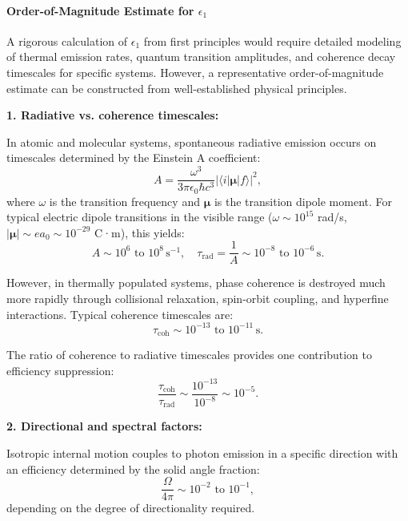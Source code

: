 \documentclass[12pt,letterpaper]{article}
\begin{document}
\paragraph{Order-of-Magnitude Estimate for $\epsilon_1$}

A rigorous calculation of $\epsilon_1$ from first principles would require detailed modeling of thermal emission rates, quantum transition amplitudes, and coherence decay timescales for specific systems. However, a representative order-of-magnitude estimate can be constructed from well-established physical principles.

\textbf{1. Radiative vs. coherence timescales:}

In atomic and molecular systems, spontaneous radiative emission occurs on timescales determined by the Einstein A coefficient:
\begin{equation}
A = \frac{\omega^3}{3\pi\epsilon_0\hbar c^3} |\langle i|\bm{\mu}|f\rangle|^2,
\end{equation}
where $\omega$ is the transition frequency and $\bm{\mu}$ is the transition dipole moment. For typical electric dipole transitions in the visible range ($\omega \sim 10^{15}$ rad/s, $|\bm{\mu}| \sim ea_0 \sim 10^{-29}$ C·m), this yields:
\begin{equation}
A \sim 10^6 \text{ to } 10^8 \, \text{s}^{-1}, \quad \tau_{\text{rad}} = \frac{1}{A} \sim 10^{-8} \text{ to } 10^{-6} \, \text{s}.
\end{equation}

However, in thermally populated systems, phase coherence is destroyed much more rapidly through collisional relaxation, spin-orbit coupling, and hyperfine interactions. Typical coherence timescales are:
\begin{equation}
\tau_{\text{coh}} \sim 10^{-13} \text{ to } 10^{-11} \, \text{s}.
\end{equation}

The ratio of coherence to radiative timescales provides one contribution to efficiency suppression:
\begin{equation}
\frac{\tau_{\text{coh}}}{\tau_{\text{rad}}} \sim \frac{10^{-13}}{10^{-8}} \sim 10^{-5}.
\end{equation}

\textbf{2. Directional and spectral factors:}

Isotropic internal motion couples to photon emission in a specific direction with an efficiency determined by the solid angle fraction:
\begin{equation}
\frac{\Omega}{4\pi} \sim 10^{-2} \text{ to } 10^{-1},
\end{equation}
depending on the degree of directionality required.
\end{document}

